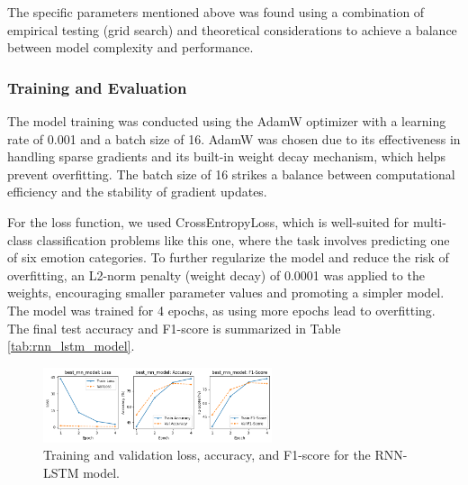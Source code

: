 The specific parameters mentioned above was found using a combination of empirical testing (grid search) and theoretical considerations to achieve a balance between model complexity and performance.

\subsubsection{Training and Evaluation}
The model training was conducted using the AdamW optimizer with a learning rate of 0.001 and a batch size of 16. AdamW was chosen due to its effectiveness in handling sparse gradients and its built-in weight decay mechanism, which helps prevent overfitting. The batch size of 16 strikes a balance between computational efficiency and the stability of gradient updates.

For the loss function, we used CrossEntropyLoss, which is well-suited for multi-class classification problems like this one, where the task involves predicting one of six emotion categories. To further regularize the model and reduce the risk of overfitting, an L2-norm penalty (weight decay) of 0.0001 was applied to the weights, encouraging smaller parameter values and promoting a simpler model. The model was trained for 4 epochs, as using more epochs lead to overfitting. The final test accuracy and F1-score is summarized in Table \ref{tab:rnn_lstm_model}.
\begin{figure}[H]
    \vspace*{0.7cm}
    \centering
    \includegraphics[width=0.6\textwidth]{figures/rnn_scores.png}
    \caption{Training and validation loss, accuracy, and F1-score for the RNN-LSTM model.}
    \label{fig:rnn_scores}
    \vspace*{0.7cm}
\end{figure}

